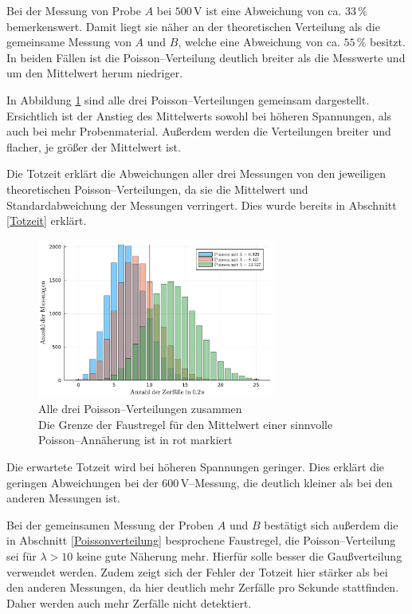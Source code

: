 \documentclass[12pt,a4paper]{scrartcl}
\numberwithin{equation}{section} %
\begin{document}
Bei der Messung von Probe $A$ bei $500\mathrm{\,V}$ ist eine Abweichung von ca. $33 \mathrm{\, \%}$ bemerkenswert. Damit liegt sie näher an der theoretischen Verteilung als die gemeinsame Messung von $A$ und $B$, welche eine Abweichung von ca. $55 \mathrm{\, \%}$ besitzt. In beiden Fällen ist die Poisson--Verteilung deutlich breiter als die Messwerte und um den Mittelwert herum niedriger.

In Abbildung \ref{fig:allePoisson} sind alle drei Poisson--Verteilungen gemeinsam dargestellt. Ersichtlich ist der Anstieg des Mittelwerts sowohl bei höheren Spannungen, als auch bei mehr Probenmaterial. Außerdem werden die Verteilungen breiter und flacher, je größer der Mittelwert ist.

Die Totzeit erklärt die Abweichungen aller drei Messungen von den jeweiligen theoretischen Poisson--Verteilungen, da sie die Mittelwert und Standardabweichung der Messungen verringert. Dies wurde bereits in Abschnitt \ref{Totzeit} erklärt.

\begin{figure}
	\centering
	\includegraphics[width=0.7\textwidth]{../media/B3.1/allePoisson.pdf}
	\caption{Alle drei Poisson--Verteilungen zusammen\\
		Die Grenze der Faustregel für den Mittelwert einer sinnvolle Poisson--Annäherung ist in rot markiert}
	\label{fig:allePoisson}	
\end{figure}

Die erwartete Totzeit wird bei höheren Spannungen geringer.  Dies erklärt die geringen Abweichungen bei der $600 \mathrm{\, V}$--Messung, die deutlich kleiner als bei den anderen Messungen ist.

Bei der gemeinsamen Messung der Proben $A$ und $B$ bestätigt sich außerdem die in Abschnitt \ref{Poissonverteilung} besprochene Faustregel, die Poisson--Verteilung sei für $\lambda > 10$ keine gute Näherung mehr. Hierfür solle besser die Gaußverteilung verwendet werden. Zudem zeigt sich der Fehler der Totzeit hier stärker als bei den anderen Messungen, da hier deutlich mehr Zerfälle pro Sekunde stattfinden. Daher werden auch mehr Zerfälle nicht detektiert.
\end{document}
